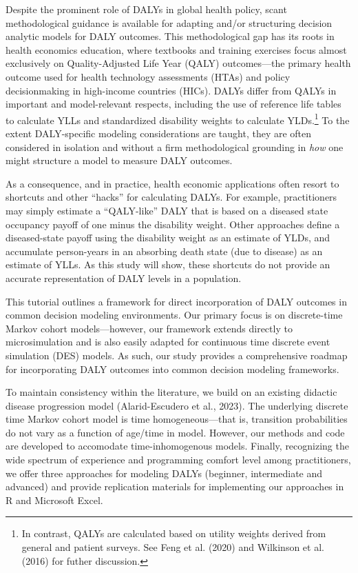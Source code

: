 \documentclass[
]{agujournal2019}
\begin{document}
Despite the prominent role of DALYs in global health policy, scant
methodological guidance is available for adapting and/or structuring
decision analytic models for DALY outcomes. This methodological gap has
its roots in health economics education, where textbooks and training
exercises focus almost exclusively on Quality-Adjusted Life Year (QALY)
outcomes---the primary health outcome used for health technology
assessments (HTAs) and policy decisionmaking in high-income countries
(HICs). DALYs differ from QALYs in important and model-relevant
respects, including the use of reference life tables to calculate YLLs
and standardized disability weights to calculate YLDs.\footnote{In
  contrast, QALYs are calculated based on utility weights derived from
  general and patient surveys. See Feng et al. (2020) and Wilkinson et
  al. (2016) for futher discussion.} To the extent DALY-specific
modeling considerations are taught, they are often considered in
isolation and without a firm methodological grounding in \emph{how} one
might structure a model to measure DALY outcomes.

As a consequence, and in practice, health economic applications often
resort to shortcuts and other ``hacks'' for calculating DALYs. For
example, practitioners may simply estimate a ``QALY-like'' DALY that is
based on a diseased state occupancy payoff of one minus the disability
weight. Other approaches define a diseased-state payoff using the
disability weight as an estimate of YLDs, and accumulate person-years in
an absorbing death state (due to disease) as an estimate of YLLs. As
this study will show, these shortcuts do not provide an accurate
representation of DALY levels in a population.

This tutorial outlines a framework for direct incorporation of DALY
outcomes in common decision modeling environments. Our primary focus is
on discrete-time Markov cohort models---however, our framework extends
directly to microsimulation and is also easily adapted for continuous
time discrete event simulation (DES) models. As such, our study provides
a comprehensive roadmap for incorporating DALY outcomes into common
decision modeling frameworks.

To maintain consistency within the literature, we build on an existing
didactic disease progression model (Alarid-Escudero et al., 2023). The
underlying discrete time Markov cohort model is time homogeneous---that
is, transition probabilities do not vary as a function of age/time in
model. However, our methods and code are developed to accomodate
time-inhomogenous models. Finally, recognizing the wide spectrum of
experience and programming comfort level among practitioners, we offer
three approaches for modeling DALYs (beginner, intermediate and
advanced) and provide replication materials for implementing our
approaches in R and Microsoft Excel.
\end{document}
